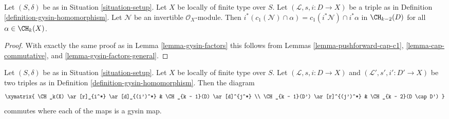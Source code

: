 \begin{lemma}
\label{lemma-gysin-commutes-cap-c1}
Let $(S, \delta)$ be as in Situation \ref{situation-setup}. Let $X$ be
locally of finite type over $S$. Let $(\mathcal{L}, s, i : D \to X)$
be a triple as in Definition \ref{definition-gysin-homomorphism}.
Let $\mathcal{N}$ be an invertible $\mathcal{O}_X$-module.
Then $i^*(c_1(\mathcal{N}) \cap \alpha) = c_1(i^*\mathcal{N}) \cap i^*\alpha$
in $\CH_{k - 2}(D)$ for all $\alpha \in \CH_k(X)$.
\end{lemma}

\begin{proof}
With exactly the same proof as in Lemma \ref{lemma-gysin-factors}
this follows from Lemmas
\ref{lemma-pushforward-cap-c1},
\ref{lemma-cap-commutative}, and
\ref{lemma-gysin-factors-general}.
\end{proof}

\begin{lemma}
\label{lemma-gysin-commutes-gysin}
Let $(S, \delta)$ be as in Situation \ref{situation-setup}. Let $X$ be locally
of finite type over $S$. Let $(\mathcal{L}, s, i : D \to X)$ and
$(\mathcal{L}', s', i' : D' \to X)$ be two triples as in
Definition \ref{definition-gysin-homomorphism}. Then the diagram
$$
\xymatrix{
\CH_k(X) \ar[r]_{i^*} \ar[d]_{(i')^*} & \CH_{k - 1}(D) \ar[d]^{j^*} \\
\CH_{k - 1}(D') \ar[r]^{(j')^*} & \CH_{k - 2}(D \cap D')
}
$$
commutes where each of the maps is a gysin map.
\end{lemma}

